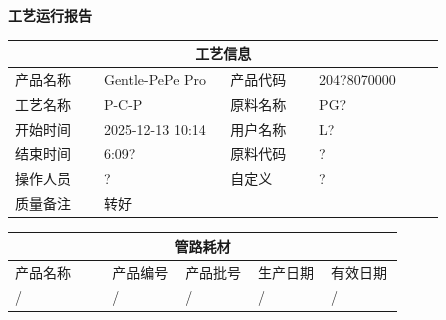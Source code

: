 \documentclass[UTF8,10pt,a4paper,fontset=fandol]{ctexart}
\newcommand{\fieldvalue}[1]{#1}
\newcommand{\handwritten}[1]{#1}
\begin{document}
\newpage

\begin{center}
\begin{minipage}[t]{0.46\linewidth}
\centering
\textbf{工艺运行报告}

\medskip
\begin{tabular}{|p{0.19\linewidth}|p{0.27\linewidth}|p{0.19\linewidth}|p{0.27\linewidth}|}
\hline
\multicolumn{4}{c}{\textbf{工艺信息}}\\
\hline
产品名称 &
\fieldvalue{Gentle-PePe Pro} &
产品代码 &
\fieldvalue{204?8070000}\\
\hline
工艺名称 &
\fieldvalue{P-C-P} &
原料名称 &
\fieldvalue{PG?}\\
\hline
开始时间 &
\fieldvalue{2025-12-13 10:14} &
用户名称 &
\fieldvalue{L?}\\
\hline
结束时间 &
\fieldvalue{6:09?} &
原料代码 &
\fieldvalue{?}\\
\hline
操作人员 &
\fieldvalue{?} &
自定义 &
\fieldvalue{?}\\
\hline
质量备注 &
\fieldvalue{\handwritten{转好}} &
\multicolumn{2}{l|}{}\\
\hline
\end{tabular}

\medskip
\begin{tabular}{|p{0.24\linewidth}|p{0.18\linewidth}|p{0.18\linewidth}|p{0.18\linewidth}|p{0.18\linewidth}|}
\hline
\multicolumn{5}{c}{\textbf{管路耗材}}\\
\hline
产品名称 & 产品编号 & 产品批号 & 生产日期 & 有效日期\\
\hline
\fieldvalue{/} &
\fieldvalue{/} &
\fieldvalue{/} &
\fieldvalue{/} &
\fieldvalue{/}\\
\hline
\end{tabular}


\end{minipage}
\end{center}
\end{document}
